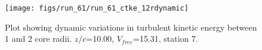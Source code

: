 \begin{figure}[H]
\centering
\texttt{[image: figs/run\_61/run\_61\_ctke\_12rdynamic]}
\caption{Plot showing dynamic variations in turbulent kinetic energy between 1 and 2 core radii. $z/c$=10.00, $V_{free}$=15.31, station 7.}
\label{fig:run_61_ctke_12rdynamic}
\end{figure}


